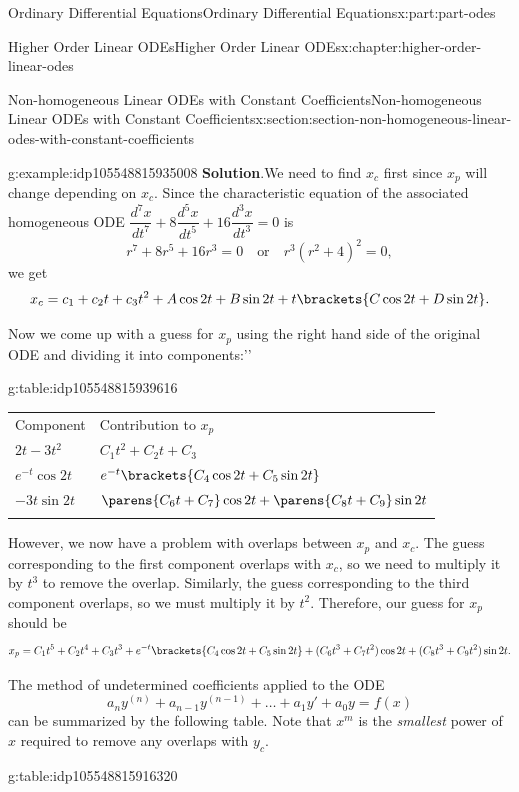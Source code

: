 \documentclass[twoside,10pt,]{book}
\newcommand{\blocktitlefont}{\relax}
\newcommand{\tabularfont}{\relax}
\numberwithin{equation}{part}
\newcommand{\hrulethick} {\noalign{\hrule height 0.11em}}
\providecommand{\dv}[3][]{\dfrac{d^{#1} #2}{d #3^{#1}}}
\begin{document}
\begin{partptx}{Ordinary Differential Equations}{}{Ordinary Differential Equations}{}{}{x:part:part-odes}
\begin{chapterptx}{Higher Order Linear ODEs}{}{Higher Order Linear ODEs}{}{}{x:chapter:higher-order-linear-odes}
\begin{sectionptx}{Non-homogeneous Linear ODEs with Constant Coefficients}{}{Non-homogeneous Linear ODEs with Constant Coefficients}{}{}{x:section:section-non-homogeneous-linear-odes-with-constant-coefficients}
\begin{example}{}{g:example:idp105548815935008}
\noindent\textbf{\blocktitlefont Solution}.\hypertarget{g:solution:idp105548815936288}{}\quad{}We need to find \(x_{c}\) first since \(x_{p}\) will change depending on \(x_{c}\). Since the characteristic equation of the associated homogeneous ODE \(\dv[7]{x}{t}+8\dv[5]{x}{t}+16\dv[3]{x}{t}=0\) is%
\begin{equation*}
r^{7}+8r^{5}+16r^{3} = 0\quad\text{or}\quad r^{3}(r^{2}+4)^{2}=0,
\end{equation*}
we get%
\begin{equation*}
x_{c} = c_{1}+c_{2}t+c_{3}t^{2}+A\cos2t+B\sin2t + t\brackets{C\cos2t+D\sin2t}.
\end{equation*}
%
\par
Now we come up with a guess for \(x_{p}\) using the right hand side of the original ODE and dividing it into \textasciigrave{}\textasciigrave{}components:'{}'{}%
\begin{tableptx}{\textbf{}}{g:table:idp105548815939616}{}%
\centering%
{\tabularfont%
\begin{tabular}{ll}\hrulethick
Component&Contribution to \(x_{p}\)\tabularnewline\hrulethick
\(2t-3t^{2}\)&\(C_{1}t^{2}+C_{2}t+C_{3}\)\tabularnewline[0pt]
\(e^{-t}\cos2t\)&\(e^{-t}\brackets{C_{4}\cos2t+C_{5}\sin2t}\)\tabularnewline[0pt]
\(-3t\sin2t\)&\(\parens{C_{6}t+C_{7}}\cos2t+\parens{C_{8}t+C_{9}}\sin2t\)\tabularnewline\hrulethick
\end{tabular}
}%
\end{tableptx}%
However, we now have a problem with overlaps between \(x_{p}\) and \(x_{c}\). The guess corresponding to the first component overlaps with \(x_{c}\), so we need to multiply it by \(t^{3}\) to remove the overlap. Similarly, the guess corresponding to the third component overlaps, so we must multiply it by \(t^{2}\). Therefore, our guess for \(x_{p}\) should be%
\begin{equation*}
x_{p} = C_{1}t^{5}+C_{2}t^{4}+C_{3}t^{3}+e^{-t}\brackets{C_{4}\cos2t+C_{5}\sin2t}+(C_{6}t^{3}+C_{7}t^{2})\cos2t+(C_{8}t^{3}+C_{9}t^{2})\sin2t.
\end{equation*}
%
\end{example}
The method of undetermined coefficients applied to the ODE%
\begin{equation*}
a_{n}y^{(n)}+a_{n-1}y^{(n-1)}+\dots+a_{1}y'+a_{0}y = f(x)   
\end{equation*}
can be summarized by the following table. Note that \(x^m\) is the \emph{smallest} power of \(x\) required to remove any overlaps with \(y_{c}\).%
\begin{tableptx}{\textbf{}}{g:table:idp105548815916320}{}%

\end{tableptx}
\end{sectionptx}
\end{chapterptx}
\end{partptx}
\end{document}
